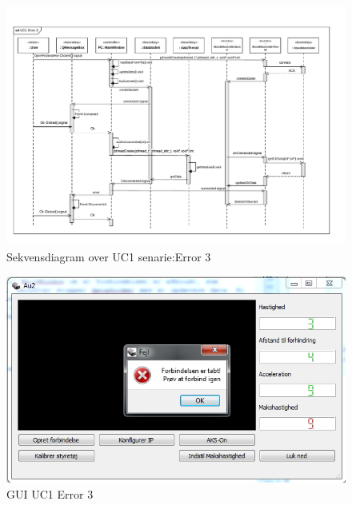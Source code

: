 \begin{figure}[H]
\centering
\includegraphics[width=\textwidth* 1,height=\textwidth* 1 ]{../fig/diagrammer/pc/sd_uc1_Error_3.pdf}
\caption{Sekvensdiagram over UC1 senarie:Error 3}
\label{fig:cd_uc1_error_3}
\end{figure}

\begin{figure}[H]
\centering
\includegraphics[width=\textwidth* 3/4,height=\textwidth* 9/20 ]{../fig/billeder/gui_uc1_error_3.png}
\caption{GUI UC1 Error 3}
\label{fig:GUI_uc1_error_3}
\end{figure}

